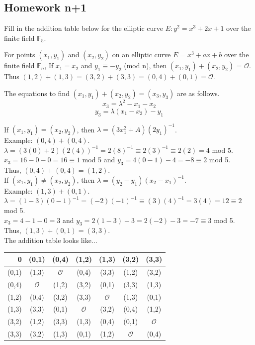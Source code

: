 \begin{problem}
\begin{problem}
\begin{problem}
\section{Homework n+1}

\begin{problem}
Fill in the addition table below for the elliptic curve $E : y^2 = x^3 + 2x + 1$ over the finite field $\mathbb{F}_5$.

\solution
For points $(x_1, y_1)$ and $(x_2, y_2)$ on an elliptic curve $E= x^3 + ax + b$ over the finite field $\mathbb{F}_n$, If $x_1 = x_2$ and $y_1 \equiv -y_2$ (mod n), then $(x_1, y_1) + (x_2, y_2)$ = $\mathcal{O}$. Thus $(1,2) + (1,3) = (3,2) + (3,3) = (0,4) + (0,1) = \mathcal{O}$.

The equations to find $(x_1, y_1) + (x_2, y_2)  = (x_{3},y_{3})$ are as follows.
$$x_{3} = \lambda ^2 - x_{1} - x_{2}$$
$$y_{3}=\lambda(x_{1}-x_{3})-y_{1}$$

If $(x_1, y_1) = (x_2, y_2)$, then $ \lambda = (3x_{1}^2+A){(2y_{1})}^{-1}$.\\
Example: $(0,4) + (0,4)$.\\
$\lambda = (3(0)+2)(2(4))^{-1} = 2(8)^{-1} \equiv 2(3)^{-1} \equiv 2(2) = 4$ mod 5.\\
$x_{3} = 16-0-0 = 16 \equiv 1$ mod 5 and $y_{3}=4(0-1) - 4 = -8 \equiv 2$ mod 5.\\
Thus, $(0,4) + (0,4) = (1,2)$.\\

If $(x_1, y_1) \neq (x_2, y_2)$, then $ \lambda = (y_{2}-y_{1})(x_{2}-x_{1})^{-1}$.\\
Example: $(1,3) + (0,1)$.\\
$\lambda = (1-3)(0-1)^{-1}=(-2)(-1)^{-1} \equiv (3)(4)^{-1}= 3(4) = 12 \equiv 2$ mod 5.\\
$x_{3} = 4-1-0 = 3$ and $y_{3}= 2(1-3) -3 =2(-2)-3 = -7 \equiv 3$ mod 5.\\
Thus, $(1,3) + (0,1) = (3,3)$.\\

The addition table looks like...

\begin{tabular}{r|cccccc}
0 & (0,1) & (0,4) & (1,2) & (1,3) & (3,2) & (3,3)\\
\hline
(0,1) & (1,3) & $\mathcal{O}$ & (0,4) & (3,3) & (1,2) & (3,2)\\
(0,4) & $\mathcal{O}$ & (1,2) & (3,2) & (0,1) & (3,3) & (1,3) \\
(1,2) & (0,4) & (3,2) & (3,3) & $\mathcal{O}$ & (1,3) & (0,1)\\
(1,3) & (3,3) & (0,1) & $\mathcal{O}$ & (3,2) & (0,4) & (1,2)\\
(3,2) & (1,2) & (3,3) & (1,3) & (0,4) & (0,1) & $\mathcal{O}$ \\
(3,3) & (3,2) & (1,3) & (0,1) & (1,2) & $\mathcal{O}$ & (0,4)\\
\end{tabular}


\end{problem}
\end{problem}
\end{problem}
\end{problem}

